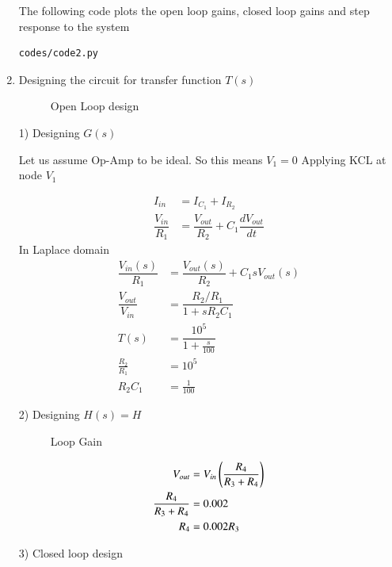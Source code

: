 \begin{enumerate}[label=\thesection.\arabic*.,ref=\thesection.\theenumi]
The following code plots the open loop gains, closed loop gains and step response to the system
\begin{lstlisting}
codes/code2.py
\end{lstlisting}


\item Designing the circuit for transfer function $T(s)$
\begin{figure}[!hbt]
	\begin{center}
			\resizebox{\columnwidth}{!}{}
	\end{center}
\caption{Open Loop design}
\label{fig:equivalent_system1}
\end{figure}

1) Designing $G(s)$

Let us assume Op-Amp to be ideal. So this means $V_{1}=0$
Applying KCL at node $V_{1}$

\begin{align}
I_{in} &= I_{C_{1}} + I_{R_{2}}
\\
\dfrac{V_{in}}{R_{1}} &= \dfrac{V_{out}}{R_{2}} + C_{1}\dfrac{dV_{out}}{dt}
\end{align}
In Laplace domain
\begin{align}
\dfrac{V_{in}(s)}{R_{1}} &= \dfrac{V_{out}(s)}{R_{2}} + C_{1}sV_{out}(s)
\\
\dfrac{V_{out}}{V_{in}} &= \dfrac{R_{2}/R_{1}}{1+sR_{2}C_{1}}
\\
T(s) &= \dfrac{10^{5}}{1+\frac{s}{100}}
\\
\frac{R_{2}}{R_{1}} &= 10^{5}
\\
R_{2}C_{1} &= \frac{1}{100}
\end{align}


2) Designing $H(s) = H$

\begin{figure}[!hbt]
	\begin{center}
			\resizebox{\columnwidth}{!}{}
	\end{center}
\caption{Loop Gain}
\label{fig:equivalent_system4}
\end{figure}

\begin{align}
	V_{out} &= V_{in} \left(\frac{R_{4}}{R_{3}+R_{4}}\right)
	\\
	{\frac{R_{4}}{R_{3}+R_{4}}} &= 0.002
	\\
	R_{4} &= 0.002 R_{3}
\end{align}

3) Closed loop design


\end{enumerate}
